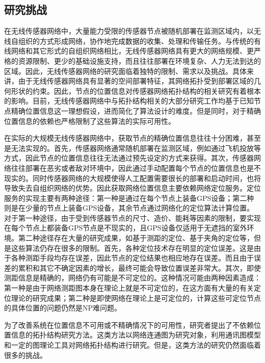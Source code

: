 \subsection{研究挑战}
在无线传感器网络中，大量能力受限的传感器节点被随机部署在监测区域内，以无线自组织的方式形成网络，协作地完成数据的收集、处理和传输任务。与传统的有线网络和其它形式的自组织网络相比，无线传感器网络具有更大的网络规模、更严格的资源限制、更少的基础设施支持，而且往往部署在环境复杂、人力无法到达的区域。因此，无线传感器网络的研究面临着独特的限制、需求以及挑战。具体来讲，由于无线传感器网络具有显著的空间部署特征，其网络拓扑受到部署区域的几何形状的约束。因此，节点的位置信息对传感器网络拓扑结构的相关研究有着根本的影响。目前，无线传感器网络中与拓扑结构相关的大部分研究工作均基于已知节点精确位置信息这一理想假设，进而简化了算法设计的难度。但是同时，对于精确位置信息的依赖也严格限制了这些算法的实际可用性。

在实际的大规模无线传感器网络中，获取节点的精确位置信息往往十分困难，甚至是无法实现的。首先，传感器网络通常随机部署在监测区域，例如通过飞机投放等方式，因此节点的位置信息往往无法通过预先设定的方式来获得。其次，传感器网络往往部署在恶劣或者敌对环境中，因此通过手动配置每个节点的位置信息也是不现实的。同时传感器网络的大规模使得人工配置需要很长的部署和启动时间，也将导致失去自组织网络的优势。因此获取网络位置信息主要依赖网络定位服务。定位服务的实现主要有两种途径：第一种是通过在每个节点上装备GPS设备；第二种则是在少量的节点上装备GPS设备，其余节点通过网络化的定位算法计算位置。对于第一种途径，由于受到传感器节点的尺寸、造价、能耗等因素的限制，要实现在每个节点上都装备GPS节点是不现实的，且GPS设备仅适用于无遮挡的室外环境。第二种途径存在大量的研究成果，如基于测距的定位、基于夹角的定位等，但是这些算法仍存在很多的限制。首先，各种定位技术存在明显的定位误差。这是由于各种测距手段均存在误差，因此节点的定位结果也相应地存在误差。而且由于误差的累积和其它不确定因素的增长，最终可能会导致位置误差非常大。其次，即使测距信息是精确的，网络仍有可能是不可定位的。这种情况可能由两种因素造成：第一种是由于网络测距图本身在理论上就是不可定位的，在这方面有大量的有关定位理论的研究成果；第二种是即使网络在理论上是可定位的，计算这些可定位节点的具体位置的问题仍然是NP难问题。

为了改善系统在位置信息不可用或不精确情况下的可用性，研究者提出了不依赖位置信息的拓扑结构研究方法。这类方法以网络连通图为研究对象，利用通讯图模型和一定的图理论工具对网络拓扑结构进行研究。但是，这类方法的研究仍然面临着很多的挑战。

